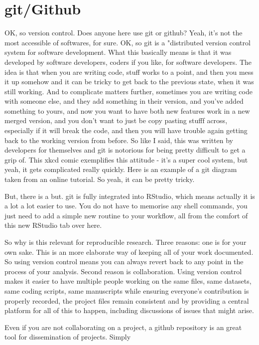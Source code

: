\documentclass[12pt]{article}
\begin{document}
\section{git/Github}
OK, so version control. Does anyone here use git or github? Yeah, it's not the most accessible of softwares, for sure. OK, so git is a "distributed version control system for software development. What this basically means is that it was developed by software developers, coders if you like, for software developers. The idea is that when you are writing code, stuff works to a point, and then you mess it up somehow and it can be tricky to get back to the previous state, when it was still working. And to complicate matters further, sometimes you are writing code with someone else, and they add something in their version, and you've added something to yours, and now you want to have both new features work in a new merged version, and you don't want to just be copy pasting stufff across, especially if it will break the code, and then you will have trouble again getting back to the working version from before. So like I said, this was written by developers for themselves and git is notorious for being pretty difficult to get a grip of. This xkcd comic exemplifies this attitude - it's a super cool system, but yeah, it gets complicated really quickly. Here is an example of a git diagram taken from an online tutorial. So yeah, it can be pretty tricky. 

But, there is a but. git is fully integrated into RStudio, which means actually it is a lot a lot easier to use. You do not have to memorise any shell commands, you just need to add a simple new routine to your workflow, all from the comfort of this new RStudio tab over here. 

So why is this relevant for reproducible research. Three reasons: one is for your own sake. This is an more elaborate way of keeping all of your work documented. So using version control means you can always revert back to any point in the process of your analysis. 
Second reason is collaboration. Using version control makes it easier to have multiple people working on the same files, same datasets, same coding scripts, same manuscripts while ensuring everyone's contribution is properly recorded, the project files remain consistent and by providing a central platform for all of this to happen, including discussions of issues that might arise. 

Even if you are not collaborating on a project, a github repository is an great tool for dissemination of projects. Simply 
\end{document}
